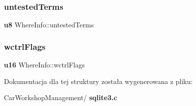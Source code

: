 \mbox{\label{struct_where_info_a4f925cad7a0a9ff977eef944969673d8}} 
\subsubsection{untestedTerms}
{\footnotesize\ttfamily \textbf{ u8} Where\+Info\+::untested\+Terms}

\mbox{\label{struct_where_info_a85ac59be7be01c6b08f8b225585d27e0}} 
\subsubsection{wctrlFlags}
{\footnotesize\ttfamily \textbf{ u16} Where\+Info\+::wctrl\+Flags}



Dokumentacja dla tej struktury została wygenerowana z pliku\+:\begin{DoxyCompactItemize}
\item 
Car\+Workshop\+Management/\textbf{ sqlite3.\+c}\end{DoxyCompactItemize}
